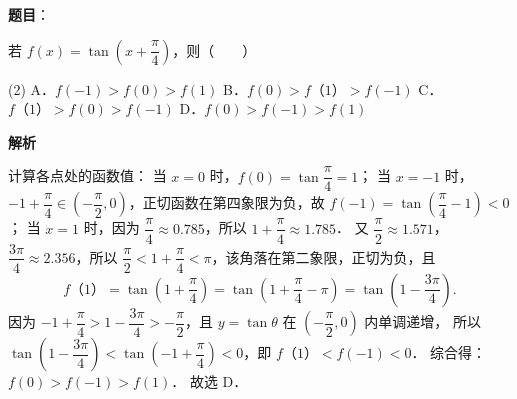 \begin{answer}

\textbf{题目}：

若 $f(x) = \tan\left(x + \dfrac{\pi}{4}\right)$，则\mbox{（　　）}

\begin{gkopts}(2)
\task A．$f(-1) > f(0) > f(1)$
\task B．$f(0) > f（1）> f(-1)$
\task C．$f（1）> f(0) > f(-1)$
\task D．$f(0) > f(-1) > f(1)$
\end{gkopts}

\textbf{解析}

计算各点处的函数值：
当 $x = 0$ 时，$f(0) = \tan\dfrac{\pi}{4} = 1$；
当 $x = -1$ 时，$-1 + \dfrac{\pi}{4} \in \left(-\dfrac{\pi}{2}, 0\right)$，正切函数在第四象限为负，故 $f(-1) = \tan\left(\dfrac{\pi}{4} - 1\right) < 0$；
当 $x = 1$ 时，因为 $\dfrac{\pi}{4} \approx 0.785$，所以 $1 + \dfrac{\pi}{4} \approx 1.785$．
又 $\dfrac{\pi}{2} \approx 1.571$，$\dfrac{3\pi}{4} \approx 2.356$，所以 $\dfrac{\pi}{2} < 1 + \dfrac{\pi}{4} < \pi$，该角落在第二象限，正切为负，且
\nopagebreak[4]
\[
f（1）= \tan\left(1 + \dfrac{\pi}{4}\right) = \tan\left(1 + \dfrac{\pi}{4} - \pi\right) = \tan\left(1 - \dfrac{3\pi}{4}\right).
\]
因为 $-1 + \dfrac{\pi}{4} > 1 - \dfrac{3\pi}{4} > -\dfrac{\pi}{2}$，且 $y = \tan\theta$ 在 $\left(-\dfrac{\pi}{2}, 0\right)$ 内单调递增，
所以 $\tan\left(1 - \dfrac{3\pi}{4}\right) < \tan\left(-1 + \dfrac{\pi}{4}\right) < 0$，即 $f（1）< f(-1) < 0$．
综合得：$f(0) > f(-1) > f(1)$．
故选 D．


\end{answer}
